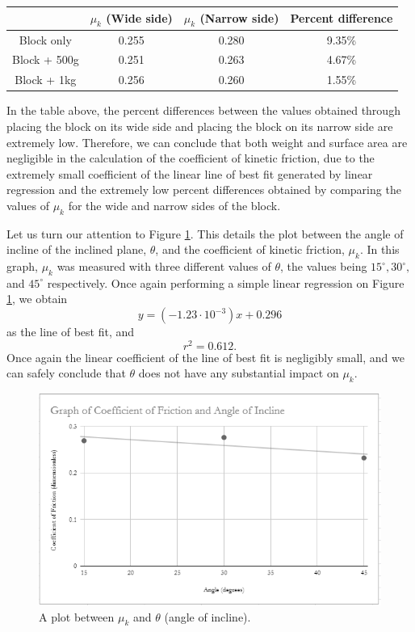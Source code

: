 \documentclass{article}
\theoremstyle{definition}
\begin{document}
\begin{center}
    \begin{tabular}{ c | c c c}
      & $\mu_k$ (Wide side) & $\mu_k$ (Narrow side) & Percent difference \\ 
     \hline
     Block only & 0.255 & 0.280 & 9.35\% \\  
     Block + 500g & 0.251 & 0.263 & 4.67\% \\  
     Block + 1kg & 0.256 & 0.260 & 1.55\%  
    \end{tabular}
\end{center}
In the table above, the percent differences between the values obtained through placing the 
block on its wide side and placing the block on its narrow side are extremely low.
Therefore, we can conclude that both weight and surface area are negligible in the
calculation of the coefficient of kinetic friction, due to the extremely small coefficient 
of the linear line of best fit generated by linear regression and the extremely low percent 
differences obtained by comparing the values of $\mu_k$ for the wide and narrow sides of the block.

Let us turn our attention to Figure \ref{fig:3}. This details the plot between the 
angle of incline of the inclined plane, $\theta$, and the coefficient of kinetic friction,
$\mu_k$. In this graph, $\mu_k$ was measured with three different values of $\theta$,
the values being $15^\circ, 30^\circ,$ and $45^\circ$ respectively. Once again performing a simple
linear regression on Figure \ref{fig:3}, we obtain
\begin{equation}
    y = (-1.23 \cdot 10^{-3})x + 0.296
\end{equation} 
as the line of best fit, and
\begin{equation}
    r^2 = 0.612.
\end{equation}
Once again the linear coefficient of the line of best fit is negligibly small, and we 
can safely conclude that $\theta$ does not have any substantial impact on $\mu_k$.
\begin{figure}
    \includegraphics[width = 1 \columnwidth]{fig3.PNG}
    \caption{A plot between $\mu_k$ and $\theta$ (angle of incline).}
    \label{fig:3}
\end{figure}
\end{document}
